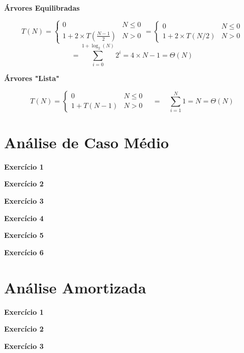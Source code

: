 \documentclass[a4paper,11pt]{article}
\begin{document}
	\noindent \textbf{Árvores Equilibradas}
	
	\[
		T(N) = 
		\begin{cases}
			0 & N \leq 0 \\
			1 + 2 \times T(\frac{N-1}{2}) & N > 0
		\end{cases}
		=
		\begin{cases}
			0 & N \leq 0 \\
			1 + 2 \times T(N/2) & N > 0
		\end{cases}
	\]
	\[
		= \sum_{i=0}^{1 + \log_2(N)} 2^i = 4 \times N - 1 = \Theta(N)
	\]
	
	\noindent \textbf{Árvores "Lista"}
	
	\[
	T(N) = 
	\begin{cases}
		0 & N \leq 0 \\
		1 + T(N - 1) & N > 0
	\end{cases}
	\quad = \quad \sum_{i=1}^{N} 1 = N = \Theta(N)
	\]
	
	
	
	\section{Análise de Caso Médio}
	
	\noindent \textbf{Exercício 1}
	
	\noindent \textbf{Exercício 2}
	
	\noindent \textbf{Exercício 3}
	
	\noindent \textbf{Exercício 4}
	
	\noindent \textbf{Exercício 5}
	
	\noindent \textbf{Exercício 6}
	
	
	\section{Análise Amortizada}
	
	\noindent \textbf{Exercício 1}
	
	\noindent \textbf{Exercício 2}
	
	\noindent \textbf{Exercício 3}
	
	
\end{document}
